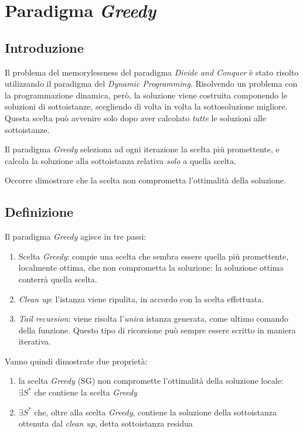\section{Paradigma \emph{Greedy}}

\subsection{Introduzione}

Il problema del memorylessness del paradigma \emph{Divide and Conquer} è stato risolto utilizzando il paradigma del \emph{Dynamic Programming}. Risolvendo un problema con la programmazione dinamica, però, la soluzione viene costruita componendo le soluzioni di sottoistanze, scegliendo di volta in volta la sottosoluzione migliore. Questa scelta può avvenire solo dopo aver calcolato \emph{tutte} le soluzioni alle sottoistanze.

Il paradigma \emph{Greedy} seleziona ad ogni iterazione la scelta più promettente, e calcola la soluzione alla sottoistanza relativa \emph{solo} a quella scelta.

Occorre dimostrare che la scelta non comprometta l'ottimalità della soluzione.

\subsection{Definizione}

Il paradigma \emph{Greedy} agisce in tre passi:
\begin{enumerate}
    \item Scelta \emph{Greedy}: compie una scelta che sembra essere quella più promettente, localmente ottima, che non comprometta la soluzione: la soluzione ottima conterrà quella scelta.
    \item \emph{Clean up}: l'istanza viene ripulita, in accordo con la scelta effettuata.
    \item \emph{Tail recursion}: viene risolta l'\emph{unica} istanza generata, come ultimo comando della funzione. Questo tipo di ricorsione può sempre essere scritto in maniera iterativa.
\end{enumerate}

Vanno quindi dimostrate due proprietà:
\begin{enumerate}
    \item la scelta \emph{Greedy} (SG) non compromette l'ottimalità della soluzione locale: \\
        $\exists S^*$ che contiene la scelta \emph{Greedy}
    \item $\exists S^*$ che, oltre alla scelta \emph{Greedy}, contiene la soluzione della sottoistanza ottenuta dal \emph{clean up}, detta sottoistanza residua
\end{enumerate}

